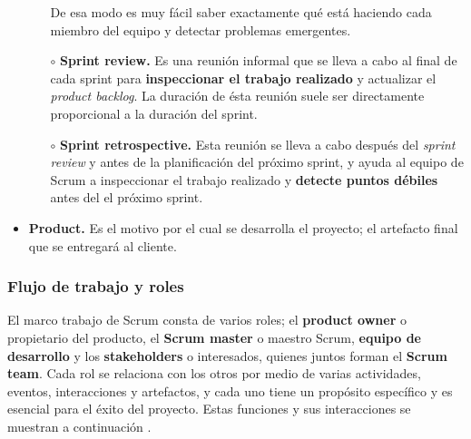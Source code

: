 \begin{itemize}
\begin{itemize}
    De esa modo es muy fácil saber exactamente qué está haciendo cada miembro del equipo y detectar problemas emergentes.
    
     \item [$\circ$] \textbf{Sprint review.} Es una reunión informal que se lleva a cabo al final de cada sprint para \textbf{inspeccionar el trabajo realizado} y actualizar el \textit{product backlog}. La duración de ésta reunión suele ser directamente proporcional a la duración del sprint.
     
     \item [$\circ$] \textbf{Sprint retrospective.} Esta reunión se lleva a cabo después del \textit{sprint review} y antes de la planificación del próximo sprint, y ayuda al equipo de Scrum a inspeccionar el trabajo realizado y \textbf{detecte puntos débiles} antes del el próximo sprint.
        
\end{itemize}

\item \textbf{Product.} Es el motivo por el cual se desarrolla el proyecto; el artefacto final que se entregará al cliente.

\end{itemize}

\subsubsection{Flujo de trabajo y roles}

El marco trabajo de Scrum consta de varios roles; el \textbf{product owner} o propietario del producto, el \textbf{Scrum master} o maestro Scrum, \textbf{equipo de desarrollo} y los \textbf{stakeholders} o interesados, quienes juntos forman el \textbf{Scrum team}. Cada rol se relaciona con los otros por medio de varias actividades, eventos, interacciones y artefactos, y cada uno tiene un propósito específico y es esencial para el éxito del proyecto. Estas funciones y sus interacciones se muestran a continuación \cite{scrum-card}.

